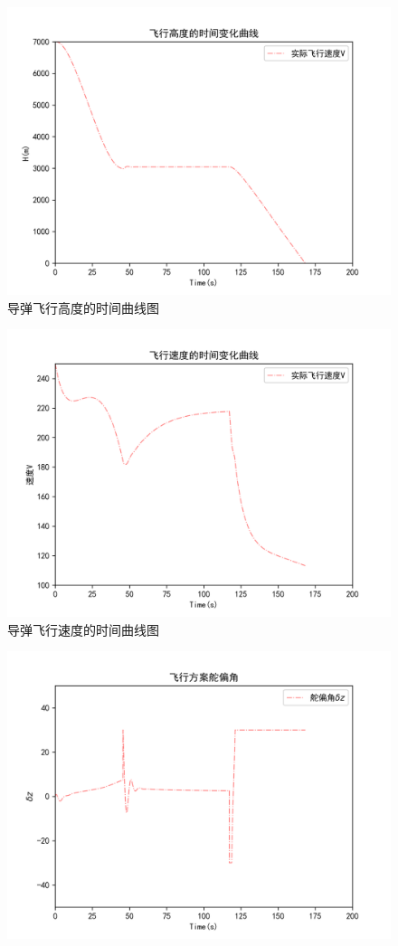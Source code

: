\documentclass[forprint]{NWPUBachelor}
\begin{document}
\begin{itemize}
\begin{figure}[H]
    \centering
    \includegraphics[width=130mm]{img/飞行高度.png}
    \caption{导弹飞行高度的时间曲线图}
\end{figure}
\begin{figure}[H]
    \centering
    \includegraphics[width=130mm]{img/飞行速度.png}
    \caption{导弹飞行速度的时间曲线图}
\end{figure}
\begin{figure}[H]
    \centering
    \includegraphics[width=130mm]{img/飞行舵偏角.png}

\end{figure}
\end{itemize}
\end{document}
